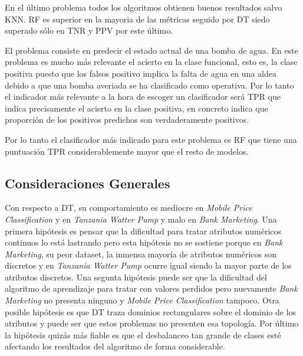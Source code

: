\documentclass[..]{subfiles}
\begin{document}
\vspace{1.5em}
En el último problema todos los algoritmos obtienen buenos resultados salvo KNN. RF es superior en la mayoria de las métricas seguido por DT siedo superado sólo en TNR y PPV por este último.

El problema consiste en predecir el estado actual de una bomba de agua. En este problema es mucho más relevante el acierto en la clase funcional, esto es, la clase positiva puesto que los falsos positivo implica la falta de agua en una aldea debido a que una bomba averiada se ha clasificado como operativa. Por lo tanto el indicador más relevante a la hora de escoger un clasificador será TPR que indica precisamente el acierto en la clase positiva, en concreto indica que proporción de los positivos predichos son verdaderamente positivos.

Por lo tanto el clasificador más indicado para este problema es RF que tiene una puntuación TPR considerablemente mayor que el resto de modelos.



\subsection{Consideraciones Generales}
\label{sec:general-considerations}
Con respecto a DT, su comportamiento es mediocre en \textit{Mobile Price Classification} y en \textit{Tanzania Watter Pump} y malo en \textit{Bank Marketing}. Una primera hipótesis es pensar que la dificultad para tratar atributos numéricos continuos lo está lastrando pero esta hipótesis no se sostiene porque en \textit{Bank Marketing}, su peor dataset, la inmensa mayoría de atributos numéricos son discretos y en \textit{Tanzania Watter Pump} ocurre igual siendo la mayor parte de los atributos discretos. Una segunta hipótesis puede ser que la dificultad del algoritmo de aprendizaje para tratar con valores perdidos pero nuevamente \textit{Bank Marketing} no presenta ninguno y \textit{Mobile Price Classification} tampoco. Otra posible hipótesis es que DT traza dominios rectangulares sobre el dominio de los atributos y puede ser que estos problemas no presenten esa topología. Por último la hipótesis quizás más fiable es que el desbalanceo tan grande de clases esté afectando los resultados del algoritmo de forma considerable.
\end{document}
